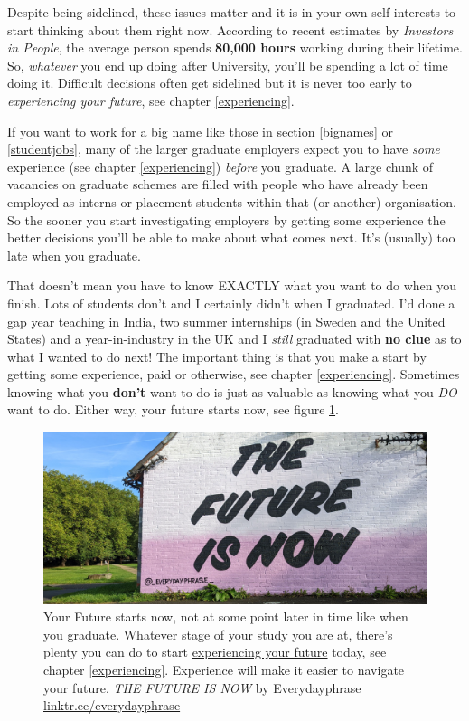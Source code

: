 \documentclass[
]{book}
\begin{document}
Despite being sidelined, these issues matter and it is in your own self interests to start thinking about them right now. According to recent estimates by \emph{Investors in People}, the average person spends \textbf{80,000 hours} working during their lifetime. \citep{iip2} So, \emph{whatever} you end up doing after University, you'll be spending a lot of time doing it. Difficult decisions often get sidelined but it is never too early to \emph{experiencing your future}, see chapter \ref{experiencing}.

If you want to work for a big name like those in section \ref{bignames} or \ref{studentjobs}, many of the larger graduate employers expect you to have \emph{some} experience (see chapter \ref{experiencing}) \emph{before} you graduate. A large chunk of vacancies on graduate schemes are filled with people who have already been employed as interns or placement students within that (or another) organisation. So the sooner you start investigating employers by getting some experience the better decisions you'll be able to make about what comes next. It's (usually) too late when you graduate.

That doesn't mean you have to know EXACTLY what you want to do when you finish. Lots of students don't and I certainly didn't when I graduated. I'd done a gap year teaching in India, two summer internships (in Sweden and the United States) and a year-in-industry in the UK and I \emph{still} graduated with \textbf{no clue} as to what I wanted to do next! The important thing is that you make a start by getting some experience, paid or otherwise, see chapter \ref{experiencing}. Sometimes knowing what you \textbf{don't} want to do is just as valuable as knowing what you \emph{DO} want to do. Either way, your future starts now, see figure \ref{fig:future-now-fig}.

\begin{figure}

{\centering \includegraphics[width=0.99\linewidth]{images/the-future-is-now} 

}

\caption{Your Future starts now, not at some point later in time like when you graduate. Whatever stage of your study you are at, there's plenty you can do to start \href{https://www.cdyf.me/experiencing}{experiencing your future} today, see chapter \ref{experiencing}. Experience will make it easier to navigate your future. \emph{THE FUTURE IS NOW} by Everydayphrase \href{https://linktr.ee/everydayphrase}{linktr.ee/everydayphrase}}\label{fig:future-now-fig}
\end{figure}
\end{document}

